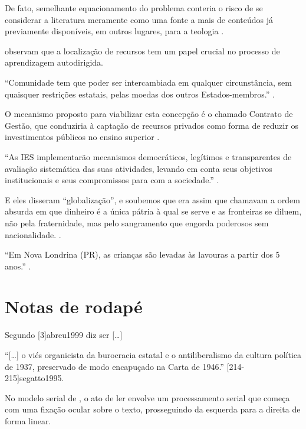 \documentclass[a4paper]{article}
\begin{document}
De fato, semelhante equacionamento do problema conteria o risco de se
considerar a literatura meramente como uma fonte a mais de conteúdos já
previamente disponíveis, em outros lugares, para a teologia
\cite[3]{jossua1976}.

\textcite{merriam1991} observam que a localização de recursos tem um papel
crucial no processo de aprendizagem autodirigida.

\enquote{Comunidade tem que poder ser intercambiada em qualquer circunstância,
sem quaisquer restrições estatais, pelas moedas dos outros Estados-membros.}
\cite[34]{comissao1992}.

O mecanismo proposto para viabilizar esta concepção é o chamado Contrato de
Gestão, que conduziria à captação de recursos privados como forma de reduzir
os investimentos públicos no ensino superior \cite{brasil1995}.

\enquote{As IES implementarão mecanismos democráticos, legítimos
e transparentes de avaliação sistemática das suas atividades, levando em conta
seus objetivos institucionais e seus compromissos para com a sociedade.}
\cite[55]{anteprojeto1987}.

E eles disseram \enquote{globalização}, e soubemos que era assim que chamavam
a ordem absurda em que dinheiro é a única pátria à qual se serve e as
fronteiras se diluem, não pela fraternidade, mas pelo sangramento que engorda
poderosos sem nacionalidade. \cite[4]{aflor1995}.

\enquote{Em Nova Londrina (PR), as crianças são levadas às lavouras a partir
dos 5 anos.} \cite[12]{noscanaviais1995}.


\section{Notas de rodapé}

Segundo [3]{abreu1999} diz ser [\ldots]

\enquote{[\ldots] o viés organicista da burocracia estatal e o antiliberalismo
da cultura política de 1937, preservado de modo encapuçado na Carta de 1946.}
[214-215]{segatto1995}.

No modelo serial de , o ato de ler envolve um
processamento serial que começa com uma fixação ocular sobre o texto,
prosseguindo da esquerda para a direita de forma linear.
\end{document}
